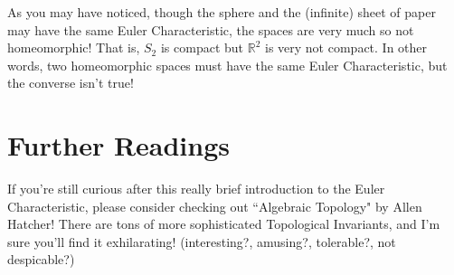 \documentclass{article}
\begin{document}
    As you may have noticed, though the sphere and the (infinite) sheet of paper may have the same Euler Characteristic, the spaces are very much so not homeomorphic!
    That is, $S_2$ is compact but $\mathbb{R}^2$ is very not compact. In other words, two homeomorphic spaces must have the same Euler Characteristic, but the converse isn't true! 
\section{Further Readings}
    If you're still curious after this really brief introduction to the Euler Characteristic, please consider checking out ``Algebraic Topology" by Allen Hatcher! 
    There are tons of more sophisticated Topological Invariants, and I'm sure you'll find it exhilarating! (interesting?, amusing?, tolerable?, not despicable?)
\end{document}
